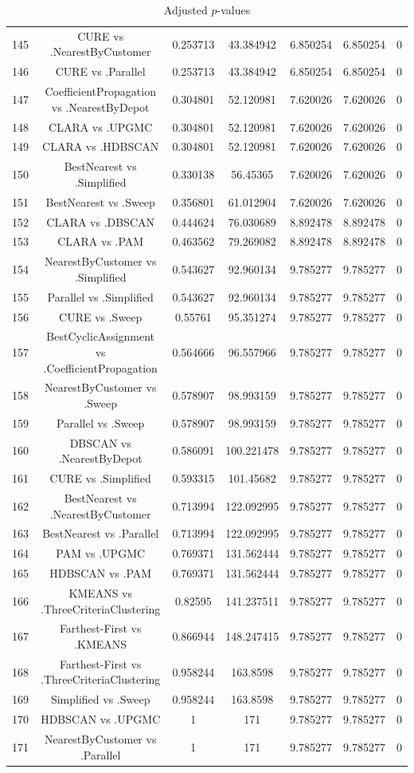\documentclass[a4paper,10pt]{article}
\begin{document}
\begin{landscape}
\begin{table}[!htp]
\begin{tabular}{ccccccc}
145&CURE vs .NearestByCustomer&0.253713&43.384942&6.850254&6.850254&0\\
146&CURE vs .Parallel&0.253713&43.384942&6.850254&6.850254&0\\
147&CoefficientPropagation vs .NearestByDepot&0.304801&52.120981&7.620026&7.620026&0\\
148&CLARA vs .UPGMC&0.304801&52.120981&7.620026&7.620026&0\\
149&CLARA vs .HDBSCAN&0.304801&52.120981&7.620026&7.620026&0\\
150&BestNearest vs .Simplified&0.330138&56.45365&7.620026&7.620026&0\\
151&BestNearest vs .Sweep&0.356801&61.012904&7.620026&7.620026&0\\
152&CLARA vs .DBSCAN&0.444624&76.030689&8.892478&8.892478&0\\
153&CLARA vs .PAM&0.463562&79.269082&8.892478&8.892478&0\\
154&NearestByCustomer vs .Simplified&0.543627&92.960134&9.785277&9.785277&0\\
155&Parallel vs .Simplified&0.543627&92.960134&9.785277&9.785277&0\\
156&CURE vs .Sweep&0.55761&95.351274&9.785277&9.785277&0\\
157&BestCyclicAssignment vs .CoefficientPropagation&0.564666&96.557966&9.785277&9.785277&0\\
158&NearestByCustomer vs .Sweep&0.578907&98.993159&9.785277&9.785277&0\\
159&Parallel vs .Sweep&0.578907&98.993159&9.785277&9.785277&0\\
160&DBSCAN vs .NearestByDepot&0.586091&100.221478&9.785277&9.785277&0\\
161&CURE vs .Simplified&0.593315&101.45682&9.785277&9.785277&0\\
162&BestNearest vs .NearestByCustomer&0.713994&122.092995&9.785277&9.785277&0\\
163&BestNearest vs .Parallel&0.713994&122.092995&9.785277&9.785277&0\\
164&PAM vs .UPGMC&0.769371&131.562444&9.785277&9.785277&0\\
165&HDBSCAN vs .PAM&0.769371&131.562444&9.785277&9.785277&0\\
166&KMEANS vs .ThreeCriteriaClustering&0.82595&141.237511&9.785277&9.785277&0\\
167&Farthest-First vs .KMEANS&0.866944&148.247415&9.785277&9.785277&0\\
168&Farthest-First vs .ThreeCriteriaClustering&0.958244&163.8598&9.785277&9.785277&0\\
169&Simplified vs .Sweep&0.958244&163.8598&9.785277&9.785277&0\\
170&HDBSCAN vs .UPGMC&1&171&9.785277&9.785277&0\\
171&NearestByCustomer vs .Parallel&1&171&9.785277&9.785277&0\\
\hline
\end{tabular}
\caption{Adjusted $p$-values}
\end{table}

\end{landscape}
\end{document}

